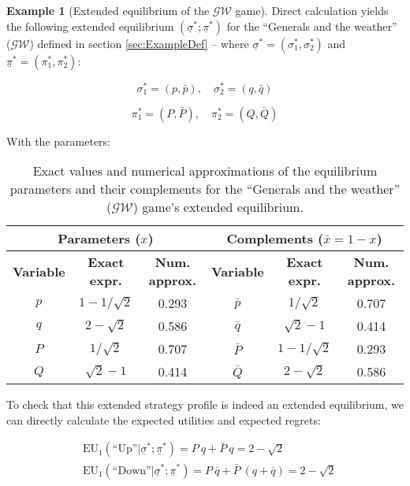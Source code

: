\documentclass{article}
\theoremstyle{definition}
\newtheorem*{example}{Example}
\begin{document}
\begin{example}[Extended equilibrium of the $\mathcal{GW}$ game]
\label{Ex:EEGW}
Direct calculation yields the following extended equilibrium $(\underline{\sigma}^*;\underline{\pi}^*)$ for the ``Generals and the weather'' ($\mathcal{GW}$) defined in section \ref{sec:ExampleDef} -- where $\underline{\sigma}^* = (\sigma_1^*, \sigma_2^*)$ and $\underline{\pi}^* = (\pi_1^*, \pi_2^*)$:

\begin{equation}
    \sigma_1^* = (p, \bar{p}), \quad
    \sigma_2^* = (q, \bar{q})
\end{equation}

\begin{equation}
    \pi_1^* = (P, \bar{P}), \quad
    \pi_2^* = (Q, \bar{Q})
\end{equation}

With the parameters:
\begin{table}[H]
    \centering
    \renewcommand{\arraystretch}{1.5}
    \begin{tabular}{|c|c|c||c|c|c|}
        \hline
        \multicolumn{3}{|c||}{\textbf{Parameters ($x$)}} & \multicolumn{3}{c|}{\textbf{Complements ($\bar{x} = 1-x$)}} \\
        \hline
        \textbf{Variable} & \textbf{Exact expr.} & \textbf{Num. approx.} & \textbf{Variable} & \textbf{Exact expr.} & \textbf{Num. approx.} \\
        \hline
        $p$ & $1-1/\sqrt{2}$ & 0.293 & $\bar{p}$ & $1/\sqrt{2}$ & 0.707 \\
        \hline
        $q$ & $2-\sqrt{2}$ & 0.586 & $\bar{q}$ & $\sqrt{2} - 1$ & 0.414 \\
        \hline
        $P$ & $1/\sqrt{2}$ & 0.707 & $\bar{P}$ & $1-1/\sqrt{2}$ & 0.293 \\
        \hline
        $Q$ & $\sqrt{2} - 1$ & 0.414 & $\bar{Q}$ & $2-\sqrt{2}$ & 0.586 \\
        \hline
    \end{tabular}
    \caption{Exact values and numerical approximations of the equilibrium parameters and their complements for the ``Generals and the weather'' ($\mathcal{GW}$) game's extended equilibrium.}
    \label{tab:variables}
\end{table}

To check that this extended strategy profile is indeed an extended equilibrium, we can directly calculate the expected utilities and expected regrets:

\begin{equation}
\begin{split}
& \mathrm{EU}_1(\text{``Up''} | \underline{\sigma}^*;\underline{\pi}^*) = P \ q + \bar{P} \ q = 2 - \sqrt{2} \\
& \mathrm{EU}_1(\text{``Down''} | \underline{\sigma}^*;\underline{\pi}^*) = P \ \bar{q} + \bar{P} \ (q+\bar{q}) = 2 - \sqrt{2}
\end{split}
\end{equation}


\end{example}
\end{document}
